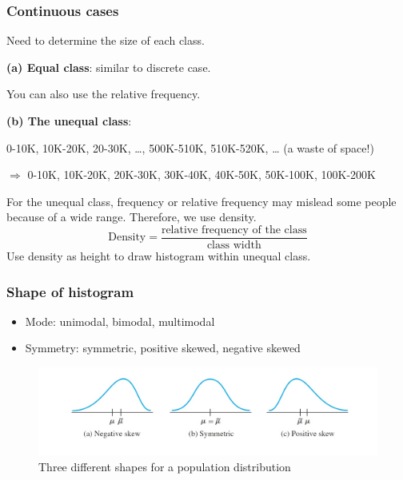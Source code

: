 \subsubsection{Continuous cases}
Need to determine the size of each class.

\textbf{(a) Equal class}: similar to discrete case.

\begin{figure}[H]
\centering
{}
\end{figure}


You can also use the relative frequency.


\textbf{(b) The unequal class}:
\begin{exmp}
  0-10K, 10K-20K, 20-30K, \dots, 500K-510K, 510K-520K, \dots 
  (a waste of space!) 
  
  $\Rightarrow $  0-10K, 10K-20K, 20K-30K, 30K-40K, 40K-50K,  50K-100K, 100K-200K
\end{exmp}
For the unequal class, frequency or relative frequency may mislead some people because of a wide range. Therefore, we use density.
\[ \text{Density} = \frac{\text{relative frequency of the class}}{\text{class width}}
\]
Use density as height to draw histogram within unequal class.
\subsubsection{Shape of histogram}
\begin{itemize}
  \item Mode: unimodal, bimodal, multimodal
  \item Symmetry: symmetric, positive skewed, negative skewed
\end{itemize}

\begin{figure}[H]
\centering
\includegraphics{figures/shape_histogram.jpg}
\caption{Three different shapes for a population distribution}
\label{fig:2}
\end{figure}

